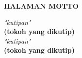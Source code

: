 \clearpage
{}
{}
\begin{center}
	\textbf{\large HALAMAN MOTTO}\\[5em]
\end{center}
\begin{center}
	
	\textit{"kutipan"} \\
	\textbf{(tokoh yang dikutip)}\\[1cm]
	\textit{"kutipan"} \\
	\textbf{(tokoh yang dikutip)}\\[1cm]
	
\end{center} 